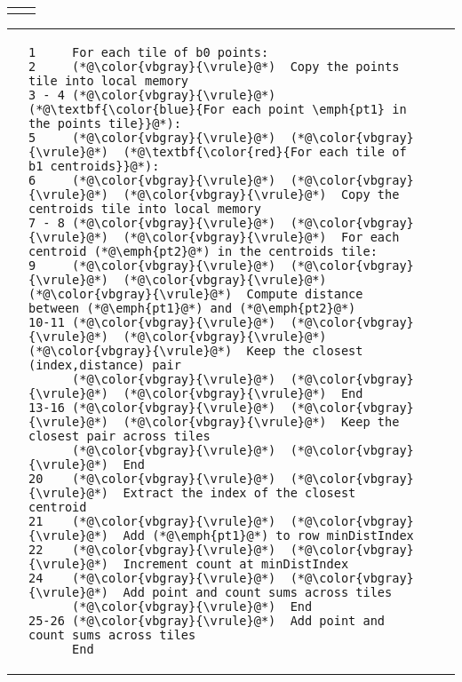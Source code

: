 \vspace{-0.2in}\begin{tabular}{cc}
{\parbox{0.45\textwidth}{}} &
{\parbox{0.5\textwidth}{}}
\end{tabular}

\hspace{-0.180\textwidth}
\centering\begin{tabular}{cm{}m{}m{}}
{} &
{\begin{lstlisting}[numbers=none,language=Pseudo]
1     For each tile of b0 points:
2     (*@\color{vbgray}{\vrule}@*)  Copy the points tile into local memory
3 - 4 (*@\color{vbgray}{\vrule}@*)  (*@\textbf{\color{blue}{For each point \emph{pt1} in the points tile}}@*):
5     (*@\color{vbgray}{\vrule}@*)  (*@\color{vbgray}{\vrule}@*)  (*@\textbf{\color{red}{For each tile of b1 centroids}}@*):
6     (*@\color{vbgray}{\vrule}@*)  (*@\color{vbgray}{\vrule}@*)  (*@\color{vbgray}{\vrule}@*)  Copy the centroids tile into local memory
7 - 8 (*@\color{vbgray}{\vrule}@*)  (*@\color{vbgray}{\vrule}@*)  (*@\color{vbgray}{\vrule}@*)  For each centroid (*@\emph{pt2}@*) in the centroids tile:
9     (*@\color{vbgray}{\vrule}@*)  (*@\color{vbgray}{\vrule}@*)  (*@\color{vbgray}{\vrule}@*)  (*@\color{vbgray}{\vrule}@*)  Compute distance between (*@\emph{pt1}@*) and (*@\emph{pt2}@*)
10-11 (*@\color{vbgray}{\vrule}@*)  (*@\color{vbgray}{\vrule}@*)  (*@\color{vbgray}{\vrule}@*)  (*@\color{vbgray}{\vrule}@*)  Keep the closest (index,distance) pair
      (*@\color{vbgray}{\vrule}@*)  (*@\color{vbgray}{\vrule}@*)  (*@\color{vbgray}{\vrule}@*)  End
13-16 (*@\color{vbgray}{\vrule}@*)  (*@\color{vbgray}{\vrule}@*)  (*@\color{vbgray}{\vrule}@*)  Keep the closest pair across tiles
      (*@\color{vbgray}{\vrule}@*)  (*@\color{vbgray}{\vrule}@*)  End
20    (*@\color{vbgray}{\vrule}@*)  (*@\color{vbgray}{\vrule}@*)  Extract the index of the closest centroid
21    (*@\color{vbgray}{\vrule}@*)  (*@\color{vbgray}{\vrule}@*)  Add (*@\emph{pt1}@*) to row minDistIndex
22    (*@\color{vbgray}{\vrule}@*)  (*@\color{vbgray}{\vrule}@*)  Increment count at minDistIndex
24    (*@\color{vbgray}{\vrule}@*)  (*@\color{vbgray}{\vrule}@*)  Add point and count sums across tiles
      (*@\color{vbgray}{\vrule}@*)  End
25-26 (*@\color{vbgray}{\vrule}@*)  Add point and count sums across tiles
      End
\end{lstlisting}} & \hfill &

\end{tabular}
